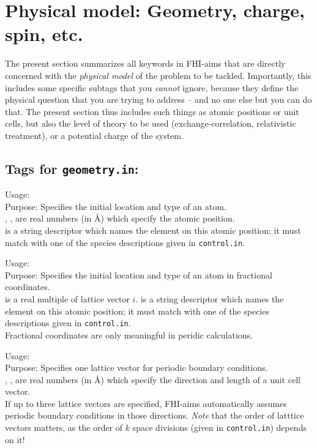 \section{Physical model: Geometry, charge, spin, etc.}

The present section summarizes all keywords in FHI-aims that are directly
concerned with the \emph{physical model} of the problem to be
tackled. Importantly, this includes some specific subtags that you
\emph{cannot} ignore, because they define the physical question that you are
trying to address -- and no one else but you can do that. The present section
thus includes such things as atomic positions or unit cells, but also the
level of theory to be used (exchange-correlation, relativistic treatment), or
a potential charge of the system. 

\subsection*{Tags for \texttt{geometry.in}:}

{
  \noindent
  Usage:    
   \\[1.0ex]
  Purpose: Specifies the initial location and type of an atom. \\[1.0ex]
  , ,  are real numbers (in \AA) which
  specify the atomic position. \\
   is a string descriptor which names the element on
    this atomic position; it must match with one of the species descriptions
    given in \texttt{control.in}. \\
}

{
  \noindent
  Usage:    
   \\[1.0ex]
  Purpose: Specifies the initial location and type of an atom in fractional coordinates. \\[1.0ex]
   is a real multiple of lattice vector $i$.
   is a string descriptor which names the element on
    this atomic position; it must match with one of the species descriptions
    given in \texttt{control.in}. \\
}
Fractional coordinates are only meaningful in peridic calculations.

{
  \noindent
  Usage:     \\[1.0ex]
  Purpose: Specifies one lattice vector for periodic boundary conditions. \\[1.0ex]
  , ,  are real numbers (in \AA) which
  specify the direction and length of a unit cell vector. \\
}
If up to three lattice vectors are specified, FHI-aims automatically assumes
periodic boundary conditions in those directions. \emph{Note} that the
order of latttice vectors matters, as the order of $k$ space divisions (given
in \texttt{control.in}) depends on it!

